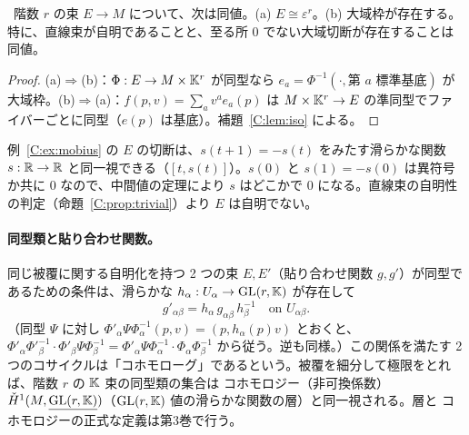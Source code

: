 \begin{prop}[自明性の判定]\label{C:prop:trivial}\tP\
階数 $r$ の束 $E\to M$ について、次は同値。(a) $E\cong\varepsilon^r$。(b) 大域枠が存在する。特に、直線束が自明であることと、至る所 $0$ でない大域切断が存在することは同値。
\end{prop}
\begin{proof}
(a)$\Rightarrow$(b)：$\Phi:E\to M\times\mathbb K^r$ が同型なら $e_a=\Phi^{-1}(\cdot,\text{第 }a\text{ 標準基底})$ が大域枠。(b)$\Rightarrow$(a)：$f(p,v)=\sum_av^ae_a(p)$ は $M\times\mathbb K^r\to E$ の準同型でファイバーごとに同型（$e(p)$ は基底）。補題~\ref{C:lem:iso} による。
\end{proof}

\begin{ex}
例~\ref{C:ex:mobius} の $E$ の切断は、$s(t+1)=-s(t)$ をみたす滑らかな関数 $s:\mathbb R\to\mathbb R$ と同一視できる（$[t,s(t)]$）。$s(0)$ と $s(1)=-s(0)$ は異符号か共に $0$ なので、中間値の定理により $s$ はどこかで $0$ になる。直線束の自明性の判定（命題~\ref{C:prop:trivial}）より $E$ は自明でない。
\end{ex}

\paragraph{同型類と貼り合わせ関数。}同じ被覆に関する自明化を持つ 2 つの束 $E,E'$（貼り合わせ関数 $g,g'$）が同型であるための条件は、滑らかな $h_\alpha:U_\alpha\to\mathrm{GL}(r,\mathbb K)$ が存在して
\begin{equation}\label{C:eq:cohom}
g'_{\alpha\beta}=h_\alpha\,g_{\alpha\beta}\,h_\beta^{-1}\quad\text{on }U_{\alpha\beta}.
\end{equation}
（同型 $\Psi$ に対し $\Phi'_\alpha\Psi\Phi_\alpha^{-1}(p,v)=(p,h_\alpha(p)v)$ とおくと、$\Phi'_\alpha\Phi'^{-1}_\beta\cdot\Phi'_\beta\Psi\Phi_\beta^{-1}=\Phi'_\alpha\Psi\Phi_\alpha^{-1}\cdot\Phi_\alpha\Phi_\beta^{-1}$ から従う。逆も同様。）この関係を満たす 2 つのコサイクルは「コホモローグ」であるという。被覆を細分して極限をとれば、階数 $r$ の $\mathbb K$ 束の同型類の集合は \Cech{} コホモロジー（非可換係数）$\check H^1(M,\underline{\mathrm{GL}(r,\mathbb K)})$（$\mathrm{GL}(r,\mathbb K)$ 値の滑らかな関数の層）と同一視される。層と \Cech{} コホモロジーの正式な定義は第3巻で行う。

